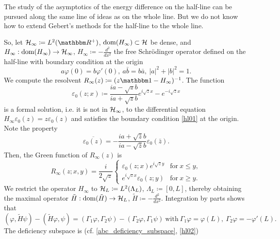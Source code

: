 The study of the asymptotics of the energy difference on the half-line can be pursued along
the same line of ideas as on the whole line. But we do not know how to extend Gebert's methods for the half-line to the whole line.

So, let $\hilbert_\infty\coloneqq L^2(\R^+)$, $\operatorname{dom}(H_\infty)\subset{\mathcal H}$ be dense,
and $H_\infty:\operatorname{dom}(H_\infty)\to{\mathcal H}_\infty$, $H_\infty \coloneqq -\frac{d^2}{dx^2}$
the free Schr\"odinger operator defined on the half-line with boundary condition at the origin
\begin{equation}\label{hl01}
  a\varphi(0) = b\varphi'(0),\ a\bar b=b\bar a,\ |a|^2+|b|^2=1.
\end{equation}
We compute the resolvent $R_\infty(z)\coloneqq (z\id-H_\infty)^{-1}$. The function
\begin{equation}\label{hl02}
  \varepsilon_0(z;x) \coloneqq \frac{ia-\sqrt{z}b}{ia+\sqrt{z}b}e^{i\sqrt{z}x} - e^{-i\sqrt{z}x}
\end{equation}
is a formal solution, i.e. it is not in ${\mathcal H}_\infty$,
to the differential equation $H_\infty \varepsilon_0(z)=z\varepsilon_0(z)$
and satisfies the boundary condition \eqref{hl01} at the origin.
Note the property
\begin{equation}\label{hl03}
  \overline{\varepsilon_0(z)} = - \frac{ia+\sqrt{\bar z}b}{ia-\sqrt{\bar z}b} \varepsilon_0(\bar z) .
\end{equation}
Then, the Green function of $R_\infty(z)$ is
\begin{equation}\label{hl04}
  R_\infty(z;x,y) = \frac{i}{2\sqrt{z}}
\begin{cases}
  \varepsilon_0(z;x)e^{i\sqrt{z}y} & \text{for}\ x\leq y , \\
  e^{i\sqrt{z}x}\varepsilon_0(z;y) & \text{for}\ x\geq y .
\end{cases}
\end{equation}
We restrict the operator $H_\infty$ to ${\mathcal H}_L\coloneqq L^2(\Lambda_L)$, $\Lambda_L\coloneqq [0,L]$, thereby obtaining the maximal operator
$\tilde H:\operatorname{dom}(\tilde H)\to{\mathcal H}_L$, $\tilde H\coloneqq -\frac{d^2}{dx^2}$.
Integration by parts shows that
\begin{equation}\label{hl05}
  (\varphi,\tilde H\psi) - (\tilde H\varphi,\psi)
  = (\Gamma_1\varphi,\Gamma_2\psi) - (\Gamma_2\varphi,\Gamma_1\psi)
    \ \text{with}\ 
  \Gamma_1\varphi = \varphi(L),\ \Gamma_2\varphi = -\varphi'(L) .
\end{equation}
The deficiency subspace is (cf. \eqref{abc_deficiency_subspace}, \eqref{hl02})

